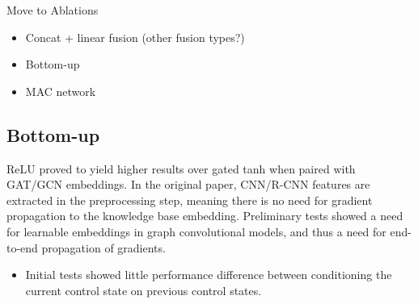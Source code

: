 {\color{red}

Move to Ablations

\begin{itemize}
  \item Concat + linear fusion (other fusion types?)
  \item Bottom-up
  \item MAC network
\end{itemize}

\subsection{Bottom-up}
\label{subsection:bottom_up}
 ReLU proved to yield higher results over gated tanh when paired with GAT/GCN embeddings. In the original paper, CNN/R-CNN features are extracted in the preprocessing step, meaning there is no need for gradient propagation to the knowledge base embedding. Preliminary tests showed a need for learnable embeddings in graph convolutional models, and thus a need for end-to-end propagation of gradients.}



\begin{itemize}
  \item Initial tests showed little performance difference between conditioning the current control state on previous control states. %
\end{itemize}
